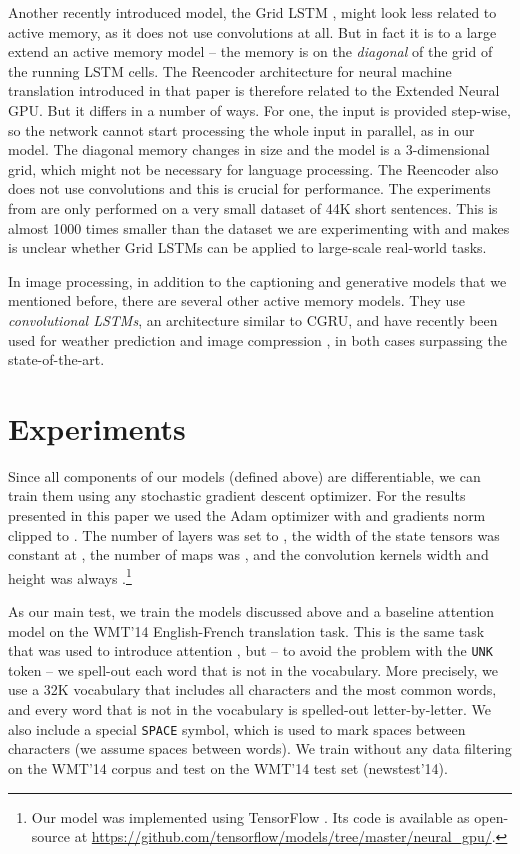 \documentclass{article}
\begin{document}
Another recently introduced model, the Grid LSTM \cite{gridLSTM15},
might look less related to active memory, as it does not use convolutions
at all. But in fact it is to a large extend an active memory model -- the memory
is on the \emph{diagonal} of the grid of the running LSTM cells.
The Reencoder architecture for neural machine translation introduced in that
paper is therefore related to the Extended Neural GPU. But it differs in a number
of ways. For one, the input is provided step-wise, so the network cannot start
processing the whole input in parallel, as in our model. The diagonal memory
changes in size and the model is a 3-dimensional grid, which might not be
necessary for language processing. The Reencoder also
does not use convolutions and this is crucial for performance. The experiments
from \cite{gridLSTM15} are only performed on a very small dataset
of 44K short sentences. This is almost 1000 times smaller than the dataset
we are experimenting with and makes is unclear whether Grid LSTMs can be applied
to large-scale real-world tasks.

In image processing, in addition to the captioning \cite{xuetal2015}
and generative models \cite{one_shot, conceptual_compression} that we
mentioned before, there are several other active memory models.
They use \emph{convolutional LSTMs}, an architecture similar to CGRU,
and  have recently been used for weather prediction
\cite{convLSTMweather} and image compression \cite{convLSTMcompress},
in both cases surpassing the state-of-the-art.


\section{Experiments} \label{sec:exp}

Since all components of our models (defined above) are differentiable,
we can train them using any stochastic gradient descent optimizer.
For the results presented in this paper we used the Adam optimizer
\cite{adam} with  and gradients norm clipped to .
The number of layers was set to , the width of the state tensors
was constant at , the number of maps was , and
the convolution kernels width and height was always .\footnote{Our model was implemented using TensorFlow \cite{tensorflow}.
  Its code is available as open-source at
  \url{https://github.com/tensorflow/models/tree/master/neural_gpu/}.}

As our main test, we train the models discussed above and a baseline
attention model on the WMT'14 English-French translation task.
This is the same task that was used to introduce attention
\cite{bahdanau2014neural}, but -- to avoid the problem with
the \texttt{UNK} token -- we spell-out each word that is not
in the vocabulary. More precisely, we use a 32K vocabulary that
includes all characters and the most common words, and every
word that is not in the vocabulary is spelled-out letter-by-letter.
We also include a special \texttt{SPACE} symbol, which is used
to mark spaces between characters (we assume spaces between words).
We train without any data filtering on the WMT'14 corpus and
test on the WMT'14 test set (newstest'14).
\end{document}
